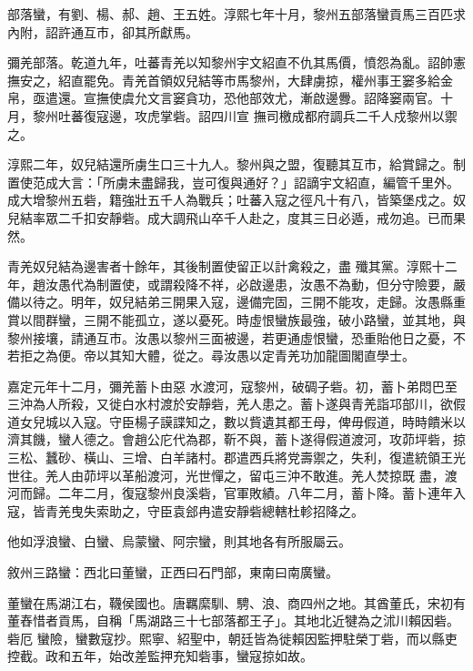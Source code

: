 \begin{pinyinscope}
 部落蠻，有劉、楊、郝、趙、王五姓。淳熙七年十月，黎州五部落蠻貢馬三百匹求內附，詔許通互市，卻其所獻馬。



 彌羌部落。乾道九年，吐蕃青羌以知黎州宇文紹直不仇其馬價，憤怨為亂。詔帥憲撫安之，紹直罷免。青羌首領奴兒結等市馬黎州，大肆虜掠，權州事王窭多給金帛，亟遣還。宣撫使虞允文言窭貪功，恐他部效尤，漸啟邊釁。詔降窭兩官。十月，黎州吐蕃復寇邊，攻虎掌砦。詔四川宣
 撫司檄成都府調兵二千人戍黎州以禦之。



 淳熙二年，奴兒結還所虜生口三十九人。黎州與之盟，復聽其互市，給賞歸之。制置使范成大言：「所虜未盡歸我，豈可復與通好？」詔謫宇文紹直，編管千里外。成大增黎州五砦，籍強壯五千人為戰兵；吐蕃入寇之徑凡十有八，皆築堡戍之。奴兒結率眾二千扣安靜砦。成大調飛山卒千人赴之，度其三日必遁，戒勿追。已而果然。



 青羌奴兒結為邊害者十餘年，其後制置使留正以計禽殺之，盡
 殲其黨。淳熙十二年，趙汝愚代為制置使，或謂殺降不祥，必啟邊患，汝愚不為動，但分守險要，嚴備以待之。明年，奴兒結弟三開果入寇，邊備完固，三開不能攻，走歸。汝愚縣重賞以間群蠻，三開不能孤立，遂以憂死。時虛恨蠻族最強，破小路蠻，並其地，與黎州接壤，請通互市。汝愚以黎州三面被邊，若更通虛恨蠻，恐重貽他日之憂，不若拒之為便。帝以其知大體，從之。尋汝愚以定青羌功加龍圖閣直學士。



 嘉定元年十二月，彌羌蓄卜由惡
 水渡河，寇黎州，破碉子砦。初，蓄卜弟悶巴至三沖為人所殺，又徙白水村渡於安靜砦，羌人患之。蓄卜遂與青羌詣邛部川，欲假道女兒城以入寇。守臣楊子謨諜知之，數以貲遺其都王母，俾毋假道，時時饋米以濟其饑，蠻人德之。會趙公庀代為郡，靳不與，蓄卜遂得假道渡河，攻茆坪砦，掠三松、蠶砂、橫山、三增、白羊諸村。郡遣西兵將党壽禦之，失利，復遣統領王光世往。羌人由茆坪以革船渡河，光世憚之，留屯三沖不敢進。羌人焚掠既
 盡，渡河而歸。二年二月，復寇黎州良溪砦，官軍敗績。八年二月，蓄卜降。蓄卜連年入寇，皆青羌曳失索助之，守臣袁郐冉遣安靜砦總轄杜軫招降之。



 他如浮浪蠻、白蠻、烏蒙蠻、阿宗蠻，則其地各有所服屬云。



 敘州三路蠻：西北曰董蠻，正西曰石門部，東南曰南廣蠻。



 董蠻在馬湖江右，韈侯國也。唐羈縻馴、騁、浪、商四州之地。其酋董氏，宋初有董舂惜者貢馬，自稱「馬湖路三十七部落都王子」。其地北近犍為之沭川賴因砦。砦厄
 蠻險，蠻數寇抄。熙寧、紹聖中，朝廷皆為徙賴因監押駐榮丁砦，而以縣吏控截。政和五年，始改差監押充知砦事，蠻寇掠如故。




\end{pinyinscope}
